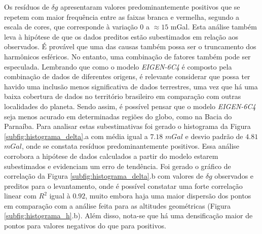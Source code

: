 Os resíduos de $\delta g$ apresentaram valores predominantemente positivos que se repetem com maior frequência entre as faixas branca e vermelha, segundo a escala de cores, que corresponde à variação $0$ a $\approx15$ mGal. Esta análise também leva à hipótese de que os dados preditos estão subestimados em relação aos observados. É provável que uma das causas também possa ser o truncamento dos harmônicos esféricos. No entanto, uma combinação de fatores também pode ser especulada. Lembrando que como o modelo \textit{EIGEN-6C4} é composto pela combinação de dados de diferentes origens, é relevante considerar que possa ter havido uma inclusão menos significativa de dados terrestres, uma vez que há uma baixa cobertura de dados no território brasileiro em comparação com outras localidades do planeta. Sendo assim, é possível pensar que o modelo \textit{EIGEN-6C4} seja menos acurado em determinadas regiões do globo, como na Bacia do Parnaíba. Para analisar estas subestimativas foi gerado o histograma da Figura \ref{subfig:histograma_delta}.a com média igual a $7.18$ $mGal$ e desvio padrão de $4.81$ $mGal$, onde se constata  resíduos predominantemente positivos. Essa análise corrobora a hipótese de dados calculados a partir do modelo estarem subestimados e evidenciam um erro de tendência. Foi gerado o gráfico de correlação da Figura \ref{subfig:histograma_delta}.b com valores de $\delta g$ observados e preditos para o levantamento, onde é possível constatar uma forte correlação  linear com $R^{2}$ igual à $0.92$, muito embora haja uma maior dispersão dos pontos em comparação com a análise feita para as altitudes geométricas (Figura \ref{subfig:histograma_h}.b). Além disso, nota-se que há uma densificação maior de pontos para valores negativos do que para positivos. 

